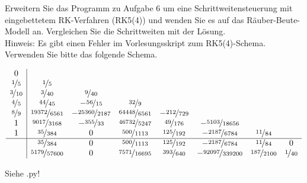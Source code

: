 \begin{exercise}
  Erweitern Sie das Programm zu Aufgabe $6$ um eine Schrittweitensteuerung mit
  eingebettetem RK-Verfahren (RK5(4)) und wenden Sie es auf das Räuber-Beute-
  Modell an. Vergleichen Sie die Schrittweiten mit der Lösung. \\

  Hinweis: Es gibt einen Fehler im Vorlesungsskript zum RK5(4)-Schema. Verwenden
  Sie bitte das folgende Schema.

  \begin{align*}
    \begin{array}{c|ccccccc}
    0 & & & & & & &                                                         \\
    \nicefrac{1}{5} & \nicefrac{1}{5} & & & & & &                                 \\
    \nicefrac{3}{10} & \nicefrac{3}{40} & \nicefrac{9}{40} & & & & &                 \\
    \nicefrac{4}{5} & \nicefrac{44}{45} & -\nicefrac{56}{15} & \nicefrac{32}{9} & & & & \\
    \nicefrac{8}{9} & \nicefrac{19372}{6561} & -\nicefrac{25360}{2187} &
    \nicefrac{64448}{6561} & -\nicefrac{212}{729} & & &                           \\
    1 & \nicefrac{9017}{3168} & -\nicefrac{355}{33} & \nicefrac{46732}{5247} &
    \nicefrac{49}{176} & -\nicefrac{5103}{18656} & &                              \\
    1 & \nicefrac{35}{384} & 0 & \nicefrac{500}{1113} & \nicefrac{125}{192} &
    -\nicefrac{2187}{6784} & \nicefrac{11}{84} &                                  \\
    \hline
     & \nicefrac{35}{384} & 0 & \nicefrac{500}{1113} & \nicefrac{125}{192} &
    -\nicefrac{2187}{6784} & \nicefrac{11}{84} & 0                                \\
     & \nicefrac{5179}{57600} & 0 & \nicefrac{7571}{16695} & \nicefrac{393}{640} &
     -\nicefrac{92097}{339200} & \nicefrac{187}{2100} & \nicefrac{1}{40}
    \end{array}
  \end{align*}

\end{exercise}

\begin{solution}
  Siehe .py!
\end{solution}
